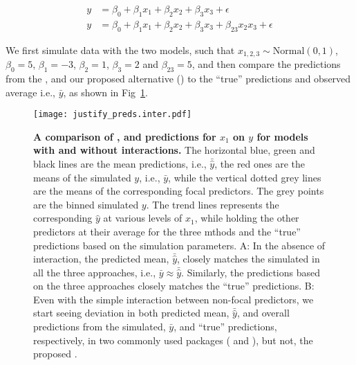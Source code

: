 %
\begin{align}
y &= \beta_0 + \beta_1x_1 + \beta_2x_2 + \beta_3x_3 + \epsilon \label{eq:simple_inter_higher_no_interaction}\\
y &= \beta_0 + \beta_1x_1 + \beta_2x_2 + \beta_3x_3 + \beta_{23}x_2x_3 + \epsilon \label{eq:simple_inter_higher}
\end{align}
%

We first simulate data with the two models, such that $x_{1,2,3} \sim \mathrm{Normal}(0, 1)$, $\beta_0 = 5$, $\beta_1 = -3$, $\beta_2 = 1$, $\beta_3 = 2$ and $\beta_{23} = 5$, and then compare the predictions from the ,  and our proposed alternative () to the ``true'' predictions and observed average i.e., $\bar{y}$, as shown in Fig~\ref{fig:justify_plots}.

\begin{figure}[!h]
\begin{center}
\texttt{[image: justify\_preds.inter.pdf]}
\end{center}
\caption{{\bf A comparison of ,  and  predictions for $x_1$ on $y$ for models with and without interactions.}
The horizontal blue, green and black lines are the mean predictions, i.e., $\bar{\hat{y}}$, the red ones are the means of the simulated $y$, i.e., $\bar{y}$, while the vertical dotted grey lines are the means of the corresponding focal predictors. The grey points are the binned simulated $y$. The trend lines represents the corresponding $\hat{y}$ at various levels of $x_1$, while holding the other predictors at their average for the three mthods and the ``true'' predictions based on the simulation parameters. A: In the absence of interaction, the predicted mean, $\bar{\hat{y}}$, closely matches the simulated in all the three approaches, i.e., $\bar{y} \approx \bar{\hat{y}}$. Similarly, the predictions based on the three approaches closely matches the ``true'' predictions. B: Even with the simple interaction between non-focal predictors, we start seeing deviation in both predicted mean, $\bar{\hat{y}}$, and overall predictions from the simulated, $\bar{y}$, and ``true'' predictions, respectively, in two commonly used packages ( and ), but not, the proposed .}
\label{fig:justify_plots}
\end{figure}

